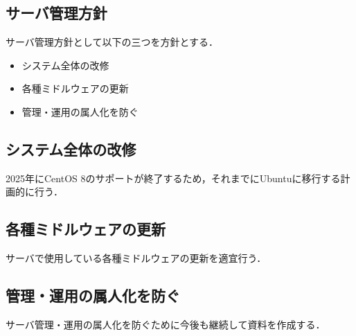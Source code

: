\subsection*{サーバ管理方針}


サーバ管理方針として以下の三つを方針とする．
\begin{itemize}
    \item システム全体の改修
    \item 各種ミドルウェアの更新
    \item 管理・運用の属人化を防ぐ
\end{itemize}

\subsection*{システム全体の改修}
2025年にCentOS 8のサポートが終了するため，それまでにUbuntuに移行する計画的に行う．

\subsection*{各種ミドルウェアの更新}
サーバで使用している各種ミドルウェアの更新を適宜行う．

\subsection*{管理・運用の属人化を防ぐ}
サーバ管理・運用の属人化を防ぐために今後も継続して資料を作成する．